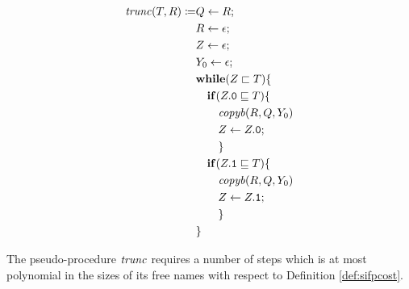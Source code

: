\begin{defn}
\begin{comment}
                      &\quad \quad \while {R.\one \sqsubseteq Q \land B} {\\
                      &\quad \quad \quad R \takes R.\one;\\
                      &\quad \quad \quad B \takes \zero;\\
                      &\quad \quad \quad }\\
                      &\quad \quad Z \takes Z.0;\\
                      &\quad \quad B \takes 0;\\
                      &\quad \quad }\\
                      &}
\end{align*}
\end{comment}
\begin{align*}
\mathit{trunc}(T, R) \coloneqq &Q \leftarrow R;\\
                      &R \leftarrow \epsilon;\\
                      &Z \leftarrow \epsilon;\\
                      &Y_0 \leftarrow \epsilon;\\
                      &\mathbf{while}(Z \sqsubset T)\{\\
                      &\quad \mathbf{if}(Z.\mathtt{0} \sqsubseteq T)\{\\
                      &\quad \quad \mathit{copyb}(R, Q, Y_0)\\
                      &\quad \quad Z \leftarrow Z.\mathtt{0};\\
                      &\quad \quad \}\\
                      &\quad \mathbf{if}(Z.\mathtt{1} \sqsubseteq T)\{\\
                      &\quad \quad \mathit{copyb}(R, Q, Y_0)\\
                      &\quad \quad Z \leftarrow Z.\mathtt{1};\\
                      &\quad \quad \}\\
                      &\}
\end{align*}
\end{defn}

\begin{lemma}
\label{lemma:comptrunc}
The pseudo-procedure $\mathit{trunc}$ requires a number of steps which is at most polynomial in the sizes of its free names with respect to Definition \ref{def:sifpcost}.
\end{lemma}


